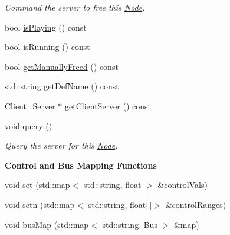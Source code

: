 \begin{DoxyCompactItemize}
\begin{DoxyCompactList}\small\item\em Command the server to free this \hyperlink{classColliderPlusPlus_1_1Node}{Node}. \end{DoxyCompactList}\item 
bool \hyperlink{classColliderPlusPlus_1_1Node_a980fe197227f373665bf11814c7e9867}{is\-Playing} () const 
\item 
bool \hyperlink{classColliderPlusPlus_1_1Node_a8acec667be684ccb5711e2364f9812d0}{is\-Running} () const 
\item 
bool \hyperlink{classColliderPlusPlus_1_1Node_ab91b556772c61c19f4e622b754d8b424}{get\-Manually\-Freed} () const 
\item 
std\-::string \hyperlink{classColliderPlusPlus_1_1Node_a40acccb0f1661a08404ee9dcdb27f051}{get\-Def\-Name} () const 
\item 
\hyperlink{classColliderPlusPlus_1_1Client__Server}{Client\-\_\-\-Server} $\ast$ \hyperlink{classColliderPlusPlus_1_1Node_a41449e5eb6d9e9233554ebcec371a5ba}{get\-Client\-Server} () const 
\item 
\hypertarget{classColliderPlusPlus_1_1Node_ac5bcb8776e2a46de4746882e1c3ab3f8}{void \hyperlink{classColliderPlusPlus_1_1Node_ac5bcb8776e2a46de4746882e1c3ab3f8}{query} ()}\label{classColliderPlusPlus_1_1Node_ac5bcb8776e2a46de4746882e1c3ab3f8}

\begin{DoxyCompactList}\small\item\em Query the server for this \hyperlink{classColliderPlusPlus_1_1Node}{Node}. \end{DoxyCompactList}\end{DoxyCompactItemize}
\begin{Indent}{\bf Control and Bus Mapping Functions}\par
\begin{DoxyCompactItemize}
\item 
void \hyperlink{classColliderPlusPlus_1_1Node_af584b2b7f4c17495f19e943e3f9a9a2c}{set} (std\-::map$<$ std\-::string, float $>$ \&control\-Vals)
\item 
void \hyperlink{classColliderPlusPlus_1_1Node_a898b7636dbf6c20c331625e7df397e1e}{setn} (std\-::map$<$ std\-::string, float\mbox{[}$\,$\mbox{]}$>$ \&control\-Ranges)
\item 
void \hyperlink{classColliderPlusPlus_1_1Node_a9cdb4fc9fac7d1cca8f1924a2668425b}{bus\-Map} (std\-::map$<$ std\-::string, \hyperlink{classColliderPlusPlus_1_1Bus}{Bus} $>$ \&map)
\end{DoxyCompactItemize}
\end{Indent}


